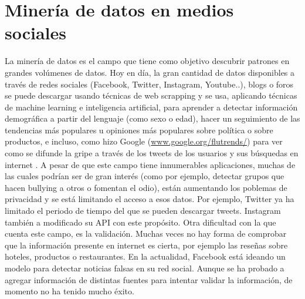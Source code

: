 \section*{Minería de datos en medios sociales}
La minería de datos es el campo que tiene como objetivo descubrir patrones en grandes volúmenes de datos. Hoy en día, la gran cantidad de datos disponibles a través de redes sociales (Facebook, Twitter, Instagram, Youtube..), blogs o foros se puede descargar usando técnicas de web scrapping y se usa, aplicando técnicas de machine learning e inteligencia artificial, para aprender a detectar información demográfica a partir del lenguaje (como sexo o edad), hacer un seguimiento de las tendencias más populares u opiniones más populares sobre política o sobre productos, e incluso, como hizo Google (\url{www.google.org/flutrends/}) para ver como se difunde la gripe a través de los tweets de los usuarios y sus búsquedas en internet \citet{elhadad2014information}. \newline
A pesar de que este campo tiene innumerables aplicaciones, muchas de las cuales podrían ser de gran interés (como por ejemplo, detectar grupos que hacen bullying a otros o fomentan el odio), están aumentando los poblemas de privacidad y se está limitando el acceso a esos datos. Por ejemplo, Twitter          ya ha limitado el periodo de tiempo del que se pueden descargar tweets. Instagram también a modificado su API con este propósito. \newline
Otra dificultad  con la que cuenta este campo, es la validación. Muchas veces no hay forma de comprobar que la información presente en internet es cierta, por ejemplo las reseñas sobre hoteles, productos o restaurantes. En la actualidad, Facebook está ideando un modelo para detectar noticias falsas en su red social. Aunque se ha probado a agregar información de distintas fuentes para intentar validar la información, de momento no ha tenido mucho éxito.    
